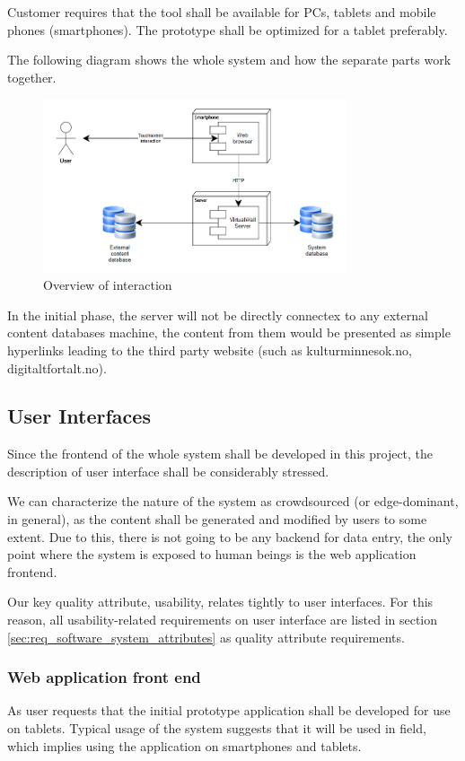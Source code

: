 \documentclass[11pt]{book}
\begin{document}
Customer requires that the tool shall be available for PCs, tablets and mobile phones (smartphones). The prototype shall be optimized for a tablet preferably.

The following diagram shows the whole system and how the separate parts work together.

\begin{figure}[H]
      \centering
      \includegraphics[width=0.8\textwidth]{Figures/Requirements/overview.png}
      \caption{Overview of interaction}
      \label{fig:req_overview}
\end{figure}

In the initial phase, the server will not be directly connectex to any external content databases machine, the content from them would be presented as simple hyperlinks leading to the third party website (such as kulturminnesok.no, digitaltfortalt.no).

\subsection{User Interfaces}
Since the frontend of the whole system shall be developed in this project, the description of user interface shall be considerably stressed.

We can characterize the nature of the system as crowdsourced (or edge-dominant, in general), as the content shall be generated and modified by users to some extent. Due to this, there is not going to be any backend for data entry, the only point where the system is exposed to human beings is the web application frontend.

Our key quality attribute, usability, relates tightly to user interfaces. For this reason, all usability-related requirements on user interface are listed in section \ref{sec:req_software_system_attributes} as quality attribute requirements.

\subsubsection{Web application front end}\label{sec:req_webapplication_frontend}
As user requests that the initial prototype application shall be developed for use on tablets. Typical usage of the system suggests that it will be used in field, which implies using the application on smartphones and tablets.
\end{document}
